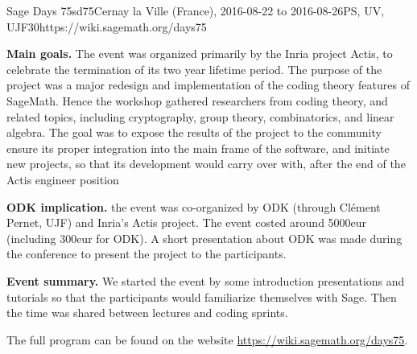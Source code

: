 \begin{event}{Sage Days 75}{sd75}{Cernay la Ville (France), 2016-08-22 to  2016-08-26}{PS, UV, UJF}{30}{https://wiki.sagemath.org/days75}

\textbf{Main goals.} The event was organized primarily by the Inria project
Actis, to celebrate the termination of its two year lifetime period. The purpose
of the project was a major redesign and implementation of the coding theory
features of SageMath. Hence the workshop gathered researchers from coding
theory, and related topics, including cryptography, group theory, combinatorics,
and linear algebra.
The goal was to expose the results of the project to the community ensure its
proper integration into the main frame of the software, and initiate new
projects, so that its development would carry over with, after the end of the
Actis engineer position

\textbf{ODK implication.} the event was co-organized by ODK (through Clément
Pernet, UJF) and Inria's Actis project. The event costed around 5000eur (including 300eur for ODK).
A short presentation about ODK was made during the conference to present the project to the participants.

\textbf{Event summary.} We started the event by some introduction presentations and tutorials so that
the participants would familiarize themselves with Sage. Then the time was shared between lectures
and coding sprints.

The full program can be found on the website \url{https://wiki.sagemath.org/days75}. 

\end{event}
